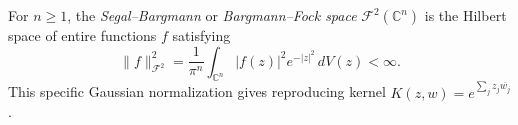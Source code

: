 
For $n\ge1$, the \emph{Segal--Bargmann} or \emph{Bargmann--Fock space} $\mathcal F^2(\mathbb C^n)$ is the Hilbert space of entire functions $f$ satisfying
\[
\|f\|_{\mathcal F^2}^2=\frac1{\pi^n}\int_{\mathbb C^n}|f(z)|^2e^{-|z|^2}\,dV(z)<\infty.
\]
This specific Gaussian normalization gives reproducing kernel $K(z,w)=e^{\sum_jz_j\overline{w_j}}$.
